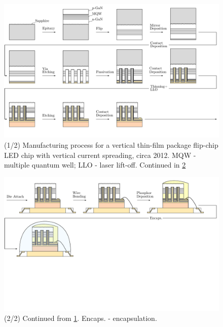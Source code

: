 \documentclass[parskip=full]{article}
\begin{document}
    \begin{landscape}
        \begin{figure}
            \includegraphics[width=595pt]{./figures/vtf_overview_2012-1.pdf}
            \caption{(1/2) Manufacturing process for a vertical thin-film  package flip-chip LED chip with vertical current spreading, circa 2012. MQW - multiple quantum well; LLO - laser lift-off. Continued in \cref{fig:manuf_vtf_2012-2}}
            \label{fig:manuf_vtf_2012-1}
        \end{figure}
    \end{landscape}

    \begin{landscape}
        \begin{figure}
            \includegraphics[width=595pt]{./figures/vtf_overview_2012-2.pdf}
            \caption{(2/2) Continued from \cref{fig:manuf_vtf_2012-1}. Encaps. - encapsulation.}
            \label{fig:manuf_vtf_2012-2}
        \end{figure}
    \end{landscape}
\end{document}
